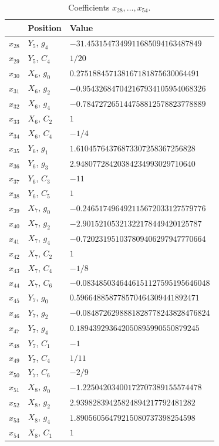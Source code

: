 \documentclass[12pt]{article}
\begin{document}
\begin{table}[H]
\centering\small
\caption{Coefficients $x_{28},\ldots,x_{54}$.}\label{tab:xb}
\begin{tabular}{lll}
\hline
 & Position & Value \\ \hline
$x_{28}$ & $Y_{5}$, $g_{4}$ & $-31.4531547349911685094163487849$ \\
$x_{29}$ & $Y_{5}$, $C_{4}$ & $1/20$ \\
$x_{30}$ & $X_{6}$, $g_{0}$ & $0.275188457138167181875630064491$ \\
$x_{31}$ & $X_{6}$, $g_{2}$ & $-0.954326847042167934105954068326$ \\
$x_{32}$ & $X_{6}$, $g_{4}$ & $-0.784727265144758812578823778889$ \\
$x_{33}$ & $X_{6}$, $C_{2}$ & $1$ \\
$x_{34}$ & $X_{6}$, $C_{4}$ & $-1/4$ \\
$x_{35}$ & $Y_{6}$, $g_{1}$ & $1.61045764376873307258367256828$ \\
$x_{36}$ & $Y_{6}$, $g_{3}$ & $2.94807728420384234993029710640$ \\
$x_{37}$ & $Y_{6}$, $C_{3}$ & $-11$ \\
$x_{38}$ & $Y_{6}$, $C_{5}$ & $1$ \\
$x_{39}$ & $X_{7}$, $g_{0}$ & $-0.246517496492115672033127579776$ \\
$x_{40}$ & $X_{7}$, $g_{2}$ & $-2.90152105321322178449420125787$ \\
$x_{41}$ & $X_{7}$, $g_{4}$ & $-0.720231951037809406297947770664$ \\
$x_{42}$ & $X_{7}$, $C_{2}$ & $1$ \\
$x_{43}$ & $X_{7}$, $C_{4}$ & $-1/8$ \\
$x_{44}$ & $X_{7}$, $C_{6}$ & $-0.0834850346446151127595195646048$ \\
$x_{45}$ & $Y_{7}$, $g_{0}$ & $0.596648858778570464309441892471$ \\
$x_{46}$ & $Y_{7}$, $g_{2}$ & $-0.0848726298881828778243828476824$ \\
$x_{47}$ & $Y_{7}$, $g_{4}$ & $0.189439293642050895990550879245$ \\
$x_{48}$ & $Y_{7}$, $C_{1}$ & $-1$ \\
$x_{49}$ & $Y_{7}$, $C_{4}$ & $1/11$ \\
$x_{50}$ & $Y_{7}$, $C_{6}$ & $-2/9$ \\
$x_{51}$ & $X_{8}$, $g_{0}$ & $-1.22504203400172707389155574478$ \\
$x_{52}$ & $X_{8}$, $g_{2}$ & $2.93982839425824894217792481282$ \\
$x_{53}$ & $X_{8}$, $g_{4}$ & $1.89056056479215080737398254598$ \\
$x_{54}$ & $X_{8}$, $C_{1}$ & $1$ \\ \hline
\end{tabular}
\end{table}
\end{document}
